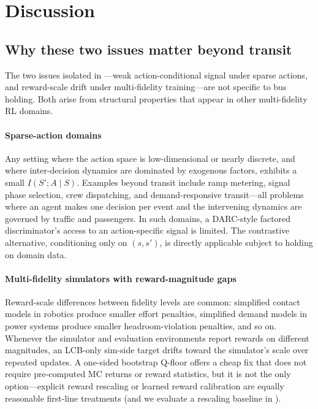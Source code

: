 \section{Discussion}
\label{sec:discussion}

\subsection{Why these two issues matter beyond transit}

The two issues isolated in ---weak action-conditional signal under sparse actions, and reward-scale drift under multi-fidelity training---are not specific to bus holding.
Both arise from structural properties that appear in other multi-fidelity RL domains.

\paragraph{Sparse-action domains}
Any setting where the action space is low-dimensional or nearly discrete, and where inter-decision dynamics are dominated by exogenous factors, exhibits a small $I(S'; A \mid S)$.
Examples beyond transit include ramp metering, signal phase selection, crew dispatching, and demand-responsive transit---all problems where an agent makes one decision per event and the intervening dynamics are governed by traffic and passengers.
In such domains, a DARC-style factored discriminator's access to an action-specific signal is limited.
The contrastive alternative, conditioning only on $(s, s')$, is directly applicable subject to  holding on domain data.

\paragraph{Multi-fidelity simulators with reward-magnitude gaps}
Reward-scale differences between fidelity levels are common: simplified contact models in robotics produce smaller effort penalties, simplified demand models in power systems produce smaller headroom-violation penalties, and so on.
Whenever the simulator and evaluation environments report rewards on different magnitudes, an LCB-only sim-side target drifts toward the simulator's scale over repeated updates.
A one-sided bootstrap Q-floor offers a cheap fix that does not require pre-computed MC returns or reward statistics, but it is not the only option---explicit reward rescaling or learned reward calibration are equally reasonable first-line treatments (and we evaluate a rescaling baseline in ).

